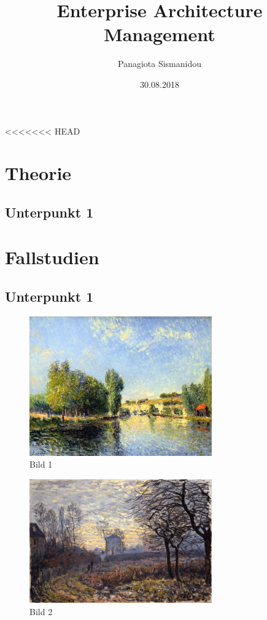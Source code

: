 \documentclass[
	A4paper,
	DIV=9,
	BCOR7mm,
	smallheadings,
	headinclude,
	footinclude,
	headsepline,
	parindent,
	german,
	captions=tableheading,
	abstracton
	]{scrreprt}
\title{Enterprise Architecture Management}
\author{Panagiota Sismanidou}
\date{30.08.2018}
\begin{document}
\maketitle

\tableofcontents

<<<<<<< HEAD
\chapter{Theorie}
\section{Unterpunkt 1}
\chapter{Fallstudien}
\section{Unterpunkt 1}


\blindtext[1]{}\autocite{:Geschwinde_Rauschdrogen}

\blindtext[2]{}\blindtext[1]{}\autocite{:Muelhardt_2013}
\begin{figure}[htbp]
\begin{center}
\includegraphics[width=0.7\textwidth]{Abbildungen/Bild1.jpg}
\caption{Bild 1}
\label{fig:Bild1}
\end{center}
\end{figure}

\blindtext[2]{}\autocite{:Wintermantel_Medizintechnik}
\begin{figure}[htbp]
\begin{center}
\includegraphics[width=0.7\textwidth]{Abbildungen/Bild2.jpg}
\caption{Bild 2}
\label{fig:Bild2}
\end{center}
\end{figure}
\end{document}
